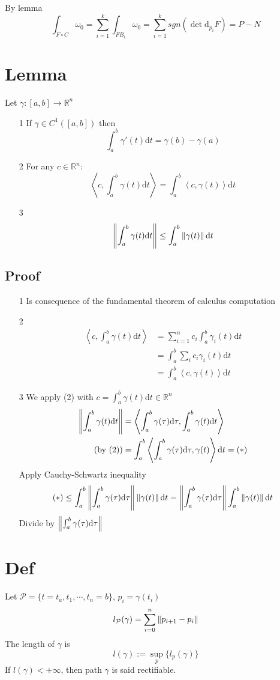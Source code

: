 \documentclass{book}
\begin{document}
By lemma
$$\int_{F\circ C}\omega_0=\sum\limits_{i=1}^k\int_{F B_i}\omega_0=\sum\limits_{i=1}^k sgn( \det\text{d}_{p_i}F)=P-N$$
\section{Lemma}
Let $\gamma:[a,b]\rightarrow\mathbb{R}^n$
\begin{itemize}
    \item[1] If $\gamma\in C^1([a,b])$ then $$\int_a^b\gamma'(t)\text{d}t=\gamma(b)-\gamma(a)$$
    \item[2] For any $c\in \mathbb{R}^n$:
    $$\left<c,\int_a^b\gamma(t)\text{d}t\right>=\int_a^b\left<c,\gamma(t)\right>\text{d}t$$
    \item[3] $$\left\lVert \int_a^b\gamma(t)\text{d}t \right\rVert\leq\int_a^b\left\lVert \gamma(t) \right\rVert\text{d}t$$
\end{itemize}
\subsection*{Proof}
\begin{itemize}
    \item[1] Is consequence of the fundamental theorem of calculus computation
    \item[2] $$\begin{aligned}
        \left<c,\int_a^b\gamma(t)\text{d}t\right>&=\sum\limits_{i=1}^nc_i\int_a^b\gamma_i(t)\text{d}t\\
        &=\int_a^b\sum\limits_ic_i\gamma_i(t)\text{d}t\\
        &=\int_a^b\left<c,\gamma(t)\right>\text{d}t
    \end{aligned}$$
    \item[3] We apply (2) with $c=\int_a^b\gamma(t)\text{d}t\in \mathbb{R}^n$$$\begin{aligned}
        \left\lVert \int_a^b\gamma(t)\text{d}t \right\rVert&=\left<\int_a^b\gamma(\tau)\text{d}\tau,\int_a^b\gamma(t)\text{d}t\right>\\
        (\text{by }(2))&=\int_a^b\left<\int_a^b\gamma(\tau)\text{d}\tau,\gamma(t)\right>\text{d}t=(*)
    \end{aligned}$$
    Apply Cauchy-Schwartz inequality
    $$(*)\leq\int_a^b\left\lVert \int_a^b\gamma(\tau)\text{d}\tau \right\rVert\left\lVert \gamma(t) \right\rVert\text{d}t=\left\lVert \int_a^b\gamma(\tau)\text{d}\tau \right\rVert\int_a^b\left\lVert \gamma(t) \right\rVert\text{d}t$$Divide by $\left\lVert \int_a^b\gamma(\tau)\text{d}\tau \right\rVert$
\end{itemize}
\section{Def}
Let $\mathcal{P}=\{t=t_a,t_1,\cdots,t_n=b\}$, $p_i=\gamma(t_i)$
$$l_\mathcal{P}(\gamma)=\sum\limits_{i=0}^n\left\lVert p_{i+1}-p_i \right\rVert$$
The length of $\gamma$ is 
$$l(\gamma):=\sup\limits_p\{l_p(\gamma)\}$$
If $l(\gamma)<+\infty$, then path $\gamma$ is said rectifiable.
\end{document}
